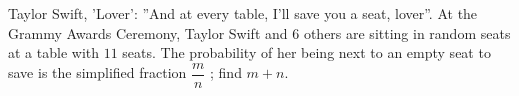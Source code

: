 Taylor Swift, 'Lover': ''And at every table, I'll save you a seat, lover''. At the Grammy Awards Ceremony, Taylor Swift and $6$ others are sitting in random seats at a table with $11$ seats. The probability of her being next to an empty seat to save is the simplified fraction $\dfrac{m}{n}$ ; find $m + n$.
